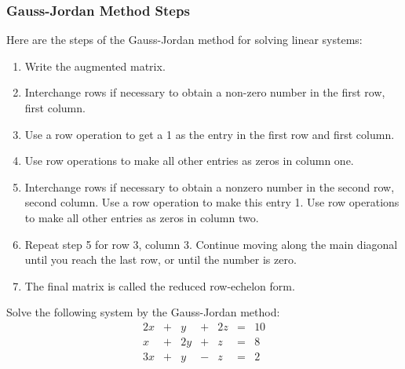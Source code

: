 \subsubsection{Gauss-Jordan Method Steps}
Here are the steps of the Gauss-Jordan method for solving linear systems:

\begin{enumerate}
    \item Write the augmented matrix.
    \item Interchange rows if necessary to obtain a non-zero number in the first row, first column.
    \item Use a row operation to get a 1 as the entry in the first row and first column.
    \item Use row operations to make all other entries as zeros in column one.
    \item Interchange rows if necessary to obtain a nonzero number in the second row, second column. Use a row operation to make this entry 1. Use row operations to make all other entries as zeros in column two.
    \item Repeat step 5 for row 3, column 3. Continue moving along the main diagonal until you reach the last row, or until the number is zero.
    \item The final matrix is called the reduced row-echelon form.
\end{enumerate}


\begin{example}
    Solve the following system by the Gauss-Jordan method:
    \[
        \begin{array}{rcrcrcrl}
            2x & + & y  & + & 2z & = & 10 \\
            x  & + & 2y & + & z  & = & 8  \\
            3x & + & y  & - & z  & = & 2  \\
        \end{array}
    \]
\end{example}

